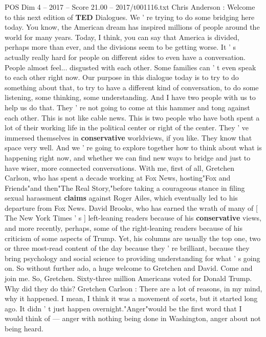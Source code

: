 \begin{textsample}{POS Dim 4 – 2017 – Score 21.00 – 2017/t001116.txt}  \label{ex:f4_pos_044}
Chris Anderson : Welcome to this next edition of \textbf{TED} Dialogues.
We ' re trying to do some bridging here today.
You know, the American dream has inspired millions of people around the world for many years.
Today, I think, you can say that America is divided, perhaps more than ever, and the divisions seem to be getting worse.
It ' s actually really hard for people on different sides to even have a conversation.
People almost feel... disgusted with each other.
Some families can ' t even speak to each other right now.
Our purpose in this dialogue today is to try to do something about that, to try to have a different kind of conversation, to do some listening, some thinking, some understanding.
And I have two people with us to help us do that.
They ' re not going to come at this hammer and tong against each other.
This is not like cable news.
This is two people who have both spent a lot of their working life in the political center or right of the center.
They ' ve immersed themselves in \textbf{conservative} worldviews, if you like.
They know that space very well.
And we ' re going to explore together how to think about what is happening right now, and whether we can find new ways to bridge and just to have wiser, more connected conversations.
With me, first of all, Gretchen Carlson, who has spent a decade working at Fox News, hosting"Fox and Friends"and then"The Real Story,"before taking a courageous stance in filing sexual harassment \textbf{claims} against Roger Ailes, which eventually led to his departure from Fox News.
David Brooks, who has earned the wrath of many of [ The New York Times ' s ] left-leaning readers because of his \textbf{conservative} views, and more recently, perhaps, some of the right-leaning readers because of his criticism of some aspects of Trump.
Yet, his columns are usually the top one, two or three most-read content of the day because they ' re brilliant, because they bring psychology and social science to providing understanding for what ' s going on.
So without further ado, a huge welcome to Gretchen and David.
Come and join me.
So, Gretchen.
Sixty-three million Americans voted for Donald Trump.
Why did they do this?
Gretchen Carlson : There are a lot of reasons, in my mind, why it happened.
I mean, I think it was a movement of sorts, but it started long ago.
It didn ' t just happen overnight."Anger"would be the first word that I would think of — anger with nothing being done in Washington, anger about not being heard.

\end{textsample}
